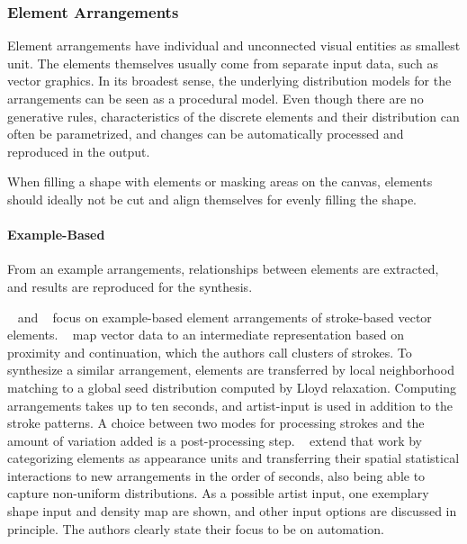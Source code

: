 \subsubsection{Element Arrangements}
\label{subsubsec:analysis_element_arrangements}

Element arrangements have individual and unconnected visual entities as smallest unit. The elements themselves usually come from separate input data, such as vector graphics. In its broadest sense, the underlying distribution models for the arrangements can be seen as a procedural model. Even though there are no generative rules, characteristics of the discrete elements and their distribution can often be parametrized, and changes can be automatically processed and reproduced in the output.

When filling a shape with elements or masking areas on the canvas, elements should ideally not be cut and align themselves for evenly filling the shape.

\paragraph*{Example-Based}
\label{para:analysis_element_arrangements_example}

From an example arrangements, relationships between elements are extracted, and results are reproduced for the synthesis. 

\citeauthor*{barla_2006_spa}~\cite{barla_2006_spa} and \citeauthor*{hurtut_2009_ags}~\cite{hurtut_2009_ags} focus on example-based element arrangements of stroke-based vector elements. \citeauthor*{barla_2006_spa}~\cite{barla_2006_spa} map vector data to an intermediate representation based on proximity and continuation, which the authors call clusters of strokes. To synthesize a similar arrangement, elements are transferred by local neighborhood matching to a global seed distribution computed by Lloyd relaxation. Computing arrangements takes up to ten seconds, and artist-input is used in addition to the stroke patterns. A choice between two modes for processing strokes and the amount of variation added is a post-processing step. \citeauthor*{hurtut_2009_ags}~\cite{hurtut_2009_ags} extend that work by categorizing elements as appearance units and transferring their spatial statistical interactions to new arrangements in the order of seconds, also being able to capture non-uniform distributions. As a possible artist input, one exemplary shape input and density map are shown, and other input options are discussed in principle. The authors clearly state their focus to be on automation.

